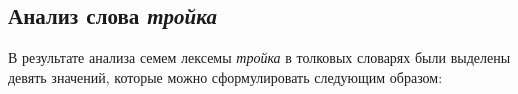 \documentclass[LI,VKR]{HSEUniversity}
\begin{document}
%
%
%

\subsection*{Анализ слова \textit{тройка}}

В результате анализа семем лексемы \textit{тройка} в толковых словарях были выделены девять значений,
которые можно сформулировать следующим образом:
\end{document}
